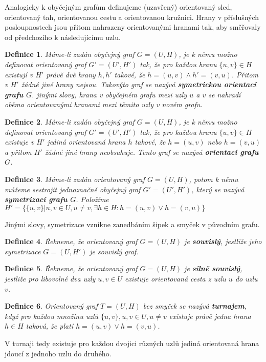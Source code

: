 \documentclass[a4paper, 11pt]{report}
\newtheorem{mydef}{Definice}[chapter]
\begin{document}
Analogicky k obyčejným grafům definujeme (uzavřený) orientovaný sled, orientovaný tah, orientovanou cestu a orientovanou kružnici. Hrany v příslušných posloupnostech jsou přitom nahrazeny orientovanými hranami tak, aby směřovaly od předchozího k následujícímu uzlu.

\begin{mydef}
Máme-li zadán obyčejný graf $G=(U, H)$, je k němu možno definovat orientovaný graf $G'=(U', H')$ tak, že pro každou hranu $\{u, v\} \in H$ existují v $H'$ právě dvě hrany $h, h'$ takové, že $h=(u,v) \land h' = (v,u)$. Přitom v $H'$ žádné jiné hrany nejsou. Takovýto graf se nazývá \textbf{symetrickou orientací grafu $G$}. jinými slovy, hrana v obyčejném grafu mezi uzly $u$ a $v$ se nahradí oběma orientovanými hranami mezi těmito uzly v novém grafu.
\end{mydef}

\begin{mydef}
Máme-li zadán obyčejný graf $G=(U, H)$, je k němu možno definovat orientovaný graf $G'=(U', H')$ tak, že pro každou hranu $\{u, v\} \in H$ existuje v $H'$ jediná orientovaná hrana $h$ takové, že $h=(u, v)$ nebo $h = (v, u)$ a přitom $H'$ žádné jiné hrany neobsahuje. Tento graf se nazývá \textbf{orientací grafu $G$}.
\end{mydef}

\begin{mydef}
Máme-li zadán orientovaný graf $G=(U, H)$, potom k němu můžeme sestrojit jednoznačně obyčejný graf $G'=(U', H')$, který se nazývá \textbf{symetrizací grafu $G$}. Položíme
$H' = \{\{u, v\} | u, v \in U, u \not= v, \exists h \in H: h=(u, v) \lor h = (v, u)\}$
\end{mydef}
Jinými slovy, symetrizace vznikne zanedbáním šipek a smyček v původním grafu.

\begin{mydef}
Řekneme, že orientovaný graf $G=(U,H)$ je \textbf{souvislý}, jestliže jeho symetrizace $G=(U, H')$ je souvislý graf.
\end{mydef}

\begin{mydef}
Řekneme, že orientovaný graf $G=(U,H)$ je \textbf{silně souvislý}, jestliže pro libovolné dva uzly $u, v \in U$ existuje orientovaná cesta z uzlu $u$ do uzlu $v$.
\end{mydef}

\begin{mydef}
Orientovaný graf $T = (U, H)$ bez smyček se nazývá \textbf{turnajem}, když pro každou množinu uzlů $\{u,v\}, u, v \in U, u \not= v$ existuje právě jedna hrana $h \in H$ taková, že platí $h = (u, v) \lor h = (v,u)$.
\end{mydef}
V turnaji tedy existuje pro každou dvojici různých uzlů jediná orientovaná hrana jdoucí z jednoho uzlu do druhého.
\end{document}
